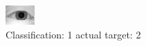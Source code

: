 \begin{figure}[h!]
\begin{center}
\includegraphics[width=0.60\columnwidth]{figures/ID859_class_1_target_2.png}
\end{center}
\caption{ Classification: 1 actual target: 2}
\label{fig:ID859_class_1_target_2}
\end{figure}
